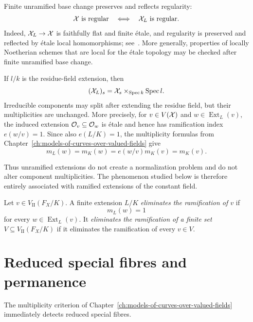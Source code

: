 \begin{remark}\label{rem:consequences-unramified-base-change}
    Finite unramified base change preserves and reflects regularity:
    \[
        \mathcal X\text{ is regular}
        \quad\Longleftrightarrow\quad
        \mathcal X_L\text{ is regular}.
    \]
    Indeed, $\mathcal X_L\to\mathcal X$ is faithfully flat and finite étale, and regularity is preserved and reflected by étale local homomorphisms; see~\cite[\href{https://stacks.math.columbia.edu/tag/025N}{Proposition 41.19.4}]{Stacks}.
    More generally, properties of locally Noetherian schemes that are local for the étale topology may be checked after finite unramified base change.

    If $l/k$ is the residue-field extension, then
    \[
        (\mathcal X_L)_s=\mathcal X_s\times_{\operatorname{Spec} k}\operatorname{Spec} l.
    \]
    Irreducible components may split after extending the residue field, but their multiplicities are unchanged.
    More precisely, for $v\in V(\mathcal X)$ and $w\in\operatorname{Ext}_L(v)$, the induced extension $\mathcal{O}_v\subseteq\mathcal{O}_w$ is étale and hence has ramification index $e(w/v)=1$.
    Since also $e(L/K)=1$, the multiplicity formulas from Chapter~\ref{ch:models-of-curves-over-valued-fields} give
    \[
        m_L(w)=m_K(w)=e(w/v)m_K(v)=m_K(v).
    \]
\end{remark}

Thus unramified extensions do not create a normalization problem and do not alter component multiplicities.
The phenomenon studied below is therefore entirely associated with ramified extensions of the constant field.

\begin{definition}\label{def:eliminates-ramification}
    Let $v\in V_\mathrm{II}(F_X/K)$.
    A finite extension $L/K$ \textit{eliminates the ramification of $v$} if
    \[
        m_L(w)=1
    \]
    for every $w\in\operatorname{Ext}_L(v)$.
    It \textit{eliminates the ramification of a finite set} $V\subseteq V_\mathrm{II}(F_X/K)$ if it eliminates the ramification of every $v\in V$.
\end{definition}

\section{Reduced special fibres and permanence}\label{sec:reduced-special-fibres-and-permanence}

The multiplicity criterion of Chapter~\ref{ch:models-of-curves-over-valued-fields} immediately detects reduced special fibres.

